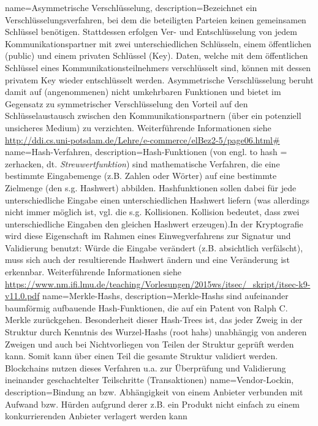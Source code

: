 {
    name=Asymmetrische Verschlüsselung,
    description={Bezeichnet ein Verschlüsselungsverfahren, bei dem die beteiligten Parteien keinen gemeinsamen Schlüssel benötigen. Stattdessen erfolgen Ver- und Entschlüsselung von jedem Kommunikationspartner mit zwei unterschiedlichen Schlüsseln, einem öffentlichen (public) und einem privaten Schlüssel (Key). Daten, welche mit dem öffentlichen Schlüssel eines Kommunikationsteilnehmers verschlüsselt sind, können mit dessen privatem Key wieder entschlüsselt werden. Asymmetrische Verschlüsselung beruht damit auf (angenommenen) nicht umkehrbaren Funktionen und bietet im Gegensatz zu symmetrischer Verschlüsselung den Vorteil auf den Schlüsselaustausch zwischen den Kommunikationspartnern (über ein potenziell unsicheres Medium) zu verzichten. Weiterführende Informationen siehe \url{http://ddi.cs.uni-potsdam.de/Lehre/e-commerce/elBez2-5/page06.html\#}}
}
{
    name=Hash-Verfahren,
    description={Hash-Funktionen (von engl. \glqq{}to hash\grqq{} = zerhacken, dt. \textit{Streuwertfunktion}) sind mathematische Verfahren, die eine bestimmte Eingabemenge (z.B. Zahlen oder Wörter) auf eine bestimmte Zielmenge (den s.g. Hashwert) abbilden. Hashfunktionen sollen dabei für jede unterschiedliche Eingabe einen unterschiedlichen Hashwert liefern (was allerdings nicht immer möglich ist, vgl. die s.g. Kollisionen. Kollision bedeutet, dass zwei unterschiedliche Eingaben den gleichen Hashwert erzeugen).In der Kryptografie wird diese Eigenschaft im Rahmen eines Einwegverfahrens zur Signatur und Validierung benutzt: Würde die Eingabe verändert (z.B. absichtlich verfälscht), muss sich auch der resultierende Hashwert ändern und eine Veränderung ist erkennbar. Weiterführende Informationen siehe \url{https://www.nm.ifi.lmu.de/teaching/Vorlesungen/2015ws/itsec/_skript/itsec-k9-v11.0.pdf}}
}
{
    name=Merkle-Hashs,
    description={Merkle-Hashs sind aufeinander baumförmig aufbauende Hash-Funktionen, die auf ein Patent von Ralph C. Merkle zurückgehen. Besonderheit dieser \glqq{}Hash-Trees\grqq{} ist, das jeder Zweig in der Struktur durch Kenntnis des Wurzel-Hashs (\glqq{}root hahs\grqq{}) unabhängig von anderen Zweigen und auch bei Nichtvorliegen von Teilen der Struktur geprüft werden kann. Somit kann über einen Teil die gesamte Struktur validiert werden. Blockchains nutzen dieses Verfahren u.a. zur Überprüfung und Validierung ineinander geschachtelter Teilschritte (Transaktionen)}
}
{
    name=Vendor-Lockin,
    description={Bindung an bzw. Abhängigkeit von einem Anbieter verbunden mit Aufwand bzw. Hürden aufgrund derer z.B. ein Produkt nicht einfach zu einem konkurrierenden Anbieter verlagert werden kann}
}


\printglossary[type=\acronymtype,title=Abkürzungsverzeichnis]

\newpage

\printglossary[type=main,title=Fachbegriffe]